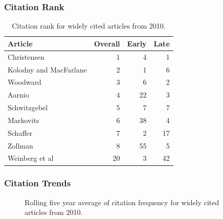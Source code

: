 \documentclass[
  10pt,
  letterpaper,
  DIV=11,
  numbers=noendperiod,
  twoside]{scrartcl}
\begin{document}
\subsubsection*{Citation Rank}\label{sec-rank-2010}

\begin{longtable}[]{@{}lrrr@{}}

\caption{\label{tbl-citation-rank-2010}Citation rank for widely cited
articles from 2010.}

\tabularnewline

\toprule\noalign{}
Article & Overall & Early & Late \\
\midrule\noalign{}
\endhead
\bottomrule\noalign{}
\endlastfoot
Christensen & 1 & 4 & 1 \\
Kolodny and MacFarlane & 2 & 1 & 6 \\
Woodward & 3 & 6 & 2 \\
Aarnio & 4 & 22 & 3 \\
Schwitzgebel & 5 & 7 & 7 \\
Markovits & 6 & 38 & 4 \\
Schaffer & 7 & 2 & 17 \\
Zollman & 8 & 55 & 5 \\
Weinberg et al & 20 & 3 & 42 \\

\end{longtable}

\subsubsection*{Citation Trends}\label{sec-trends-2010}

\begin{figure}


\caption{\label{fig-citation-spaghetti-2010}Rolling five year average of
citation frequency for widely cited articles from 2010.}

\end{figure}%
\end{document}
